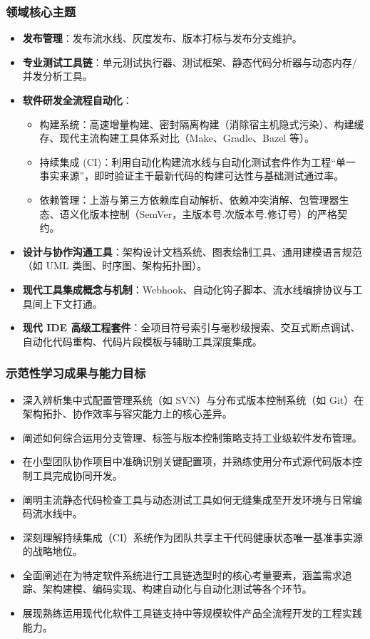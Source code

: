 \subsubsection{领域核心主题}
\begin{itemize}
    \item \textbf{发布管理}：发布流水线、灰度发布、版本打标与发布分支维护。
    \item \textbf{专业测试工具链}：单元测试执行器、测试框架、静态代码分析器与动态内存/并发分析工具。
    \item \textbf{软件研发全流程自动化}：
    \begin{itemize}
        \item 构建系统：高速增量构建、密封隔离构建（消除宿主机隐式污染）、构建缓存、现代主流构建工具体系对比（Make、Gradle、Bazel 等）。
        \item 持续集成 (CI)：利用自动化构建流水线与自动化测试套件作为工程“单一事实来源”，即时验证主干最新代码的构建可达性与基础测试通过率。
        \item 依赖管理：上游与第三方依赖库自动解析、依赖冲突消解、包管理器生态、语义化版本控制（SemVer，主版本号.次版本号.修订号）的严格契约。
    \end{itemize}
    \item \textbf{设计与协作沟通工具}：架构设计文档系统、图表绘制工具、通用建模语言规范（如 UML 类图、时序图、架构拓扑图）。
    \item \textbf{现代工具集成概念与机制}：Webhook、自动化钩子脚本、流水线编排协议与工具间上下文打通。
    \item \textbf{现代 IDE 高级工程套件}：全项目符号索引与毫秒级搜索、交互式断点调试、自动化代码重构、代码片段模板与辅助工具深度集成。
\end{itemize}

\subsubsection{示范性学习成果与能力目标}
\begin{itemize}
    \item 深入辨析集中式配置管理系统（如 SVN）与分布式版本控制系统（如 Git）在架构拓扑、协作效率与容灾能力上的核心差异。
    \item 阐述如何综合运用分支管理、标签与版本控制策略支持工业级软件发布管理。
    \item 在小型团队协作项目中准确识别关键配置项，并熟练使用分布式源代码版本控制工具完成协同开发。
    \item 阐明主流静态代码检查工具与动态测试工具如何无缝集成至开发环境与日常编码流水线中。
    \item 深刻理解持续集成（CI）系统作为团队共享主干代码健康状态唯一基准事实源的战略地位。
    \item 全面阐述在为特定软件系统进行工具链选型时的核心考量要素，涵盖需求追踪、架构建模、编码实现、构建自动化与自动化测试等各个环节。
    \item 展现熟练运用现代化软件工具链支持中等规模软件产品全流程开发的工程实践能力。
\end{itemize}

